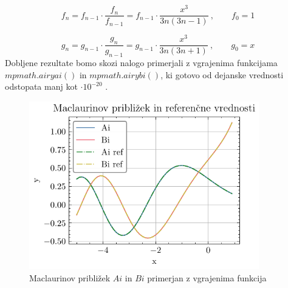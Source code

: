 \documentclass[slovene,11pt,a4paper]{article}
\newcommand{\ee}[1]{\cdot 10^{#1}}
\begin{document}
\begin{equation*}
  f_n = f_{n-1} \cdot \frac{f_n}{f_{n-1}} = f_{n-1} \cdot \frac{x^3}{3n(3n - 1)} \>, \qquad f_0 = 1
\end{equation*}

\begin{equation*}
  g_n = g_{n-1} \cdot \frac{g_n}{g_{n-1}} = g_{n-1} \cdot \frac{x^3}{3n(3n + 1)} \>, \qquad g_0 = x
\end{equation*}
Dobljene rezultate bomo skozi nalogo primerjali z vgrajenima funkcijama $mpmath.airyai()$ in $mpmath.airybi()$, ki gotovo od dejanske vrednosti odstopata manj kot $\ee{-20}$ \cite{airy_luka}.

\begin{figure}[ht]
\begin{center}
  \includegraphics[width=10cm]{graphs/mac_draw.pdf}
  \caption{Maclaurinov približek $Ai$ in $Bi$ primerjan z vgrajenima funkcija}
  \label{fig: mac_draw}
\end{center}
\end{figure}
\end{document}
